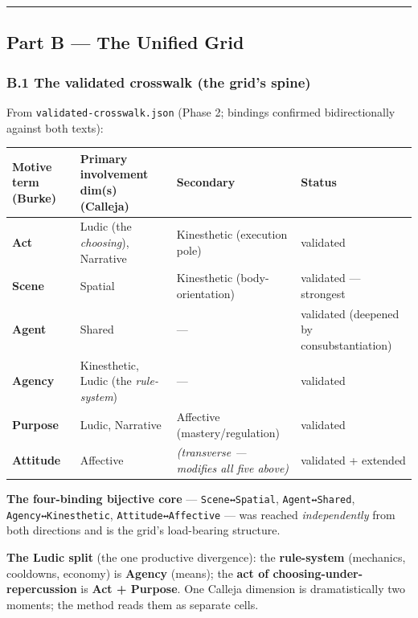 \documentclass[11pt]{report}
\begin{document}
\vspace{0.4em}\hrule\vspace{0.8em}


\subsection{Part B — The Unified Grid}


\subsubsection{B.1 The validated crosswalk (the grid's spine)}


From \texttt{validated-\discretionary{}{}{}crosswalk.\discretionary{}{}{}json} (Phase 2; bindings confirmed bidirectionally against both texts):


\begin{table}[H]
\small
\renewcommand{\arraystretch}{1.25}
\begin{tabularx}{\textwidth}{>{\RaggedRight\arraybackslash}X>{\RaggedRight\arraybackslash}X>{\RaggedRight\arraybackslash}X>{\RaggedRight\arraybackslash}X}
\toprule
Motive term (Burke) & Primary involvement dim(s) (Calleja) & Secondary & Status \\
\midrule
\textbf{Act} & Ludic (the \textit{choosing}), Narrative & Kinesthetic (execution pole) & validated \\
\textbf{Scene} & Spatial & Kinesthetic (body-orientation) & validated — strongest \\
\textbf{Agent} & Shared & — & validated (deepened by consubstantiation) \\
\textbf{Agency} & Kinesthetic, Ludic (the \textit{rule-system}) & — & validated \\
\textbf{Purpose} & Ludic, Narrative & Affective (mastery/regulation) & validated \\
\textbf{Attitude} & Affective & \textit{(transverse — modifies all five above)} & validated + extended \\
\bottomrule
\end{tabularx}
\end{table}


\textbf{The four-binding bijective core} — \texttt{Scene↔Spatial}, \texttt{Agent↔Shared}, \texttt{Agency↔Kinesthetic}, \texttt{Attitude↔Affective} — was reached \textit{independently} from both directions and is the grid's load-bearing structure.


\textbf{The Ludic split} (the one productive divergence): the \textbf{rule-system} (mechanics, cooldowns, economy) is \textbf{Agency} (means); the \textbf{act of choosing-under-repercussion} is \textbf{Act + Purpose}. One Calleja dimension is dramatistically two moments; the method reads them as separate cells.
\end{document}
